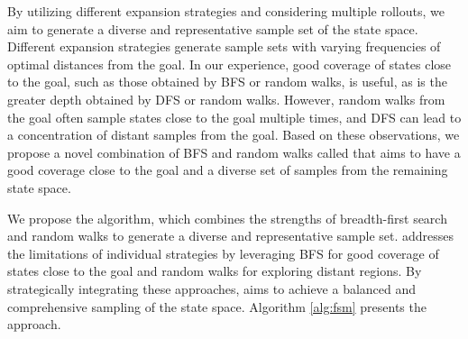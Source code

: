 By utilizing different expansion strategies and considering multiple rollouts, we aim to generate a diverse and representative sample set of the state space. Different expansion strategies generate sample sets with varying frequencies of optimal distances from the goal. In our experience, good coverage of states close to the goal, such as those obtained by BFS or random walks, is useful, as is the greater depth obtained by DFS or random walks. However, random walks from the goal often sample states close to the goal multiple times, and DFS can lead to a concentration of distant samples from the goal. Based on these observations, we propose a novel combination of BFS and random walks called \bfsrw that aims to have a good coverage close to the goal and a diverse set of samples from the remaining state space.

We propose the \bfsrw algorithm, which combines the strengths of breadth-first search and random walks to generate a diverse and representative sample set. \bfsrw addresses the limitations of individual strategies by leveraging BFS for good coverage of states close to the goal and random walks for exploring distant regions. By strategically integrating these approaches, \bfsrw aims to achieve a balanced and comprehensive sampling of the state space. Algorithm \ref{alg:fsm} presents the approach.

